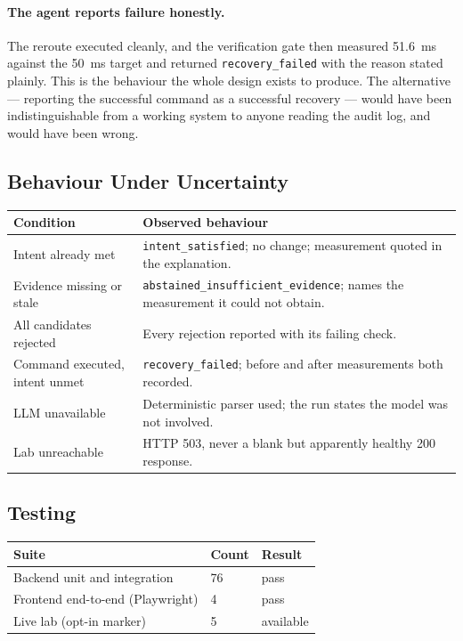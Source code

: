 \documentclass[12pt,a4paper]{report}
\begin{document}
\paragraph{The agent reports failure honestly.}
The reroute executed cleanly, and the verification gate then measured 51.6~ms
against the 50~ms target and returned \texttt{recovery\_failed} with the reason
stated plainly. This is the behaviour the whole design exists to produce. The
alternative --- reporting the successful command as a successful recovery ---
would have been indistinguishable from a working system to anyone reading the
audit log, and would have been wrong.

\subsection{Behaviour Under Uncertainty}

\begin{center}
\begin{tabular}{@{}L{4.6cm}L{8.4cm}@{}}
\toprule
\textbf{Condition} & \textbf{Observed behaviour} \\
\midrule
Intent already met
  & \texttt{intent\_satisfied}; no change; measurement quoted in the explanation. \\
Evidence missing or stale
  & \texttt{abstained\_insufficient\_evidence}; names the measurement it could
    not obtain. \\
All candidates rejected
  & Every rejection reported with its failing check. \\
Command executed, intent unmet
  & \texttt{recovery\_failed}; before and after measurements both recorded. \\
LLM unavailable
  & Deterministic parser used; the run states the model was not involved. \\
Lab unreachable
  & HTTP 503, never a blank but apparently healthy 200 response. \\
\bottomrule
\end{tabular}
\end{center}

\subsection{Testing}

\begin{center}
\begin{tabular}{@{}L{6.0cm}C{3.0cm}C{3.0cm}@{}}
\toprule
\textbf{Suite} & \textbf{Count} & \textbf{Result} \\
\midrule
Backend unit and integration   & 76 & pass \\
Frontend end-to-end (Playwright) & 4 & pass \\
Live lab (opt-in marker)       & 5 & available \\
\bottomrule
\end{tabular}
\end{center}
\end{document}

